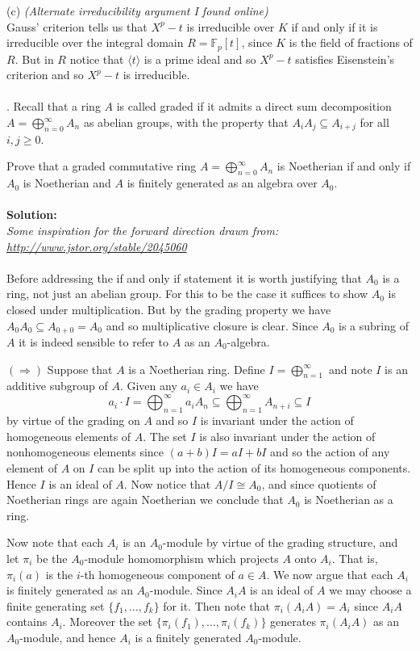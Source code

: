 \documentclass[11pt]{article}
\newcommand{\F}{\mathbb{F}}
\begin{document}
(c) \emph{(Alternate irreducibility argument I found online)}\\
Gauss' criterion tells us that $X^p-t$ is irreducible over $K$ if and only if it is irreducible over the integral domain $R=\F_p[t]$, since $K$ is the field of fractions of $R$. But in $R$ notice that $\langle t\rangle$ is a prime ideal and so $X^p-t$ satisfies Eisenstein's criterion and so $X^p-t$ is irreducible.\\\\


. Recall that a ring $A$ is called graded if it admits a direct sum decomposition $A = \bigoplus_{n=0}^\infty A_n$ as abelian groups, with the property that $A_iA_j \subseteq A_{i+j}$
for all $i, j \ge 0$.

Prove that a graded commutative ring $A = \bigoplus_{n=0}^\infty A_n$ is Noetherian if and only if $A_0$ is
Noetherian and $A$ is finitely generated as an algebra over $A_0$.\\\\
\textbf{Solution:}\\
\emph{Some inspiration for the forward direction drawn from: \url{http://www.jstor.org/stable/2045060}}\\\\
Before addressing the if and only if statement it is worth justifying that $A_0$ is a ring, not just an abelian group. For this to be the case it suffices to show $A_0$ is closed under multiplication. But by the grading property we have $A_0 A_0 \subseteq A_{0+0} = A_0$ and so multiplicative closure is clear. Since $A_0$ is a subring of $A$ it is indeed sensible to refer to $A$ as an $A_0$-algebra.

$(\Rightarrow)$ Suppose that $A$ is a  Noetherian ring. Define $I= \bigoplus_{n=1}^\infty$ and note $I$ is an additive subgroup of $A$. Given any $a_i\in A_i$ we have \[
a_i\cdot I = \bigoplus_{n=1}^\infty a_i A_n \subseteq \bigoplus_{n=1}^\infty A_{n+i} \subseteq I
\]
by virtue of the grading on $A$ and so $I$ is invariant under the action of homogeneous elements of $A$. The set $I$ is also invariant under the action of nonhomogeneous elements since $(a+b)I = aI + b I$ and so the action of any element of $A$ on $I$ can be split up into the action of its homogeneous components. Hence $I$ is an ideal of $A$. Now notice that $A/I \cong A_0$, and since quotients of Noetherian rings are again Noetherian we conclude that $A_0$ is Noetherian as a ring. 

Now note that each $A_i$ is an $A_0$-module by virtue of the grading structure, and let $\pi_i$ be the $A_0$-module homomorphism which projects $A$ onto $A_i$. That is, $\pi_i(a)$ is the $i$-th homogeneous component of $a\in A$. We now argue that each $A_i$ is finitely generated as an $A_0$-module. Since $A_iA$ is an ideal of $A$ we may choose a finite generating set $\{f_1,\ldots, f_k\}$ for it. Then note that $\pi_i(A_iA) = A_i$ since $A_iA$ contains $A_i$. Moreover the set $\{\pi_i(f_1),\ldots, \pi_i(f_k)\}$ generates $\pi_i(A_iA)$ as an $A_0$-module, and hence $A_i$ is a finitely generated $A_0$-module.
\end{document}
